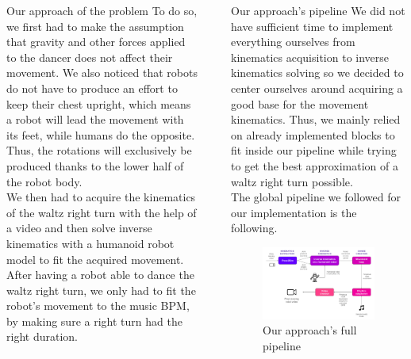 \documentclass[final]{beamer}
\newlength{\sepwidth}
\newlength{\colwidth}
\newcommand{\separatorcolumn}{\begin{column}{\sepwidth}\end{column}}
\begin{document}
\begin{frame}[t]
\begin{columns}[t]
\begin{column}{\colwidth}
\begin{alertblock}{Our approach of the problem}
To do so, we first had to make the assumption that gravity and other forces applied to the dancer does not affect their movement. We also noticed that robots do not have to produce an effort to keep their chest upright, which means a robot will lead the movement with its feet, while humans do the opposite. 
Thus, the rotations will exclusively be produced thanks to the lower half of the robot body. \\
We then had to acquire the kinematics of the waltz right turn with the help of a video and then solve inverse kinematics with a humanoid robot model to fit the acquired movement. 
After having a robot able to dance the waltz right turn, we only had to fit the robot's movement to the music BPM, by making sure a right turn had the right duration.
 \end{alertblock}
 
\end{column}
\separatorcolumn
\begin{column}{\colwidth}
 \begin{block}{Our approach's pipeline}
  We did not have sufficient time to implement everything ourselves from kinematics acquisition to inverse kinematics solving so we decided to center ourselves around acquiring a good base for the movement kinematics. 
  Thus, we mainly relied on already implemented blocks to fit inside our pipeline while trying to get the best approximation of a waltz right turn possible. \\ 
  The global pipeline we followed for our implementation is the following.
  
    \begin{figure}
      \centering
      \includegraphics[width = 0.99 \columnwidth]{img/solution_pipeline.png}
      \caption{Our approach's full pipeline}
    \end{figure}
    

\end{block}
\end{column}
\end{columns}
\end{frame}
\end{document}
